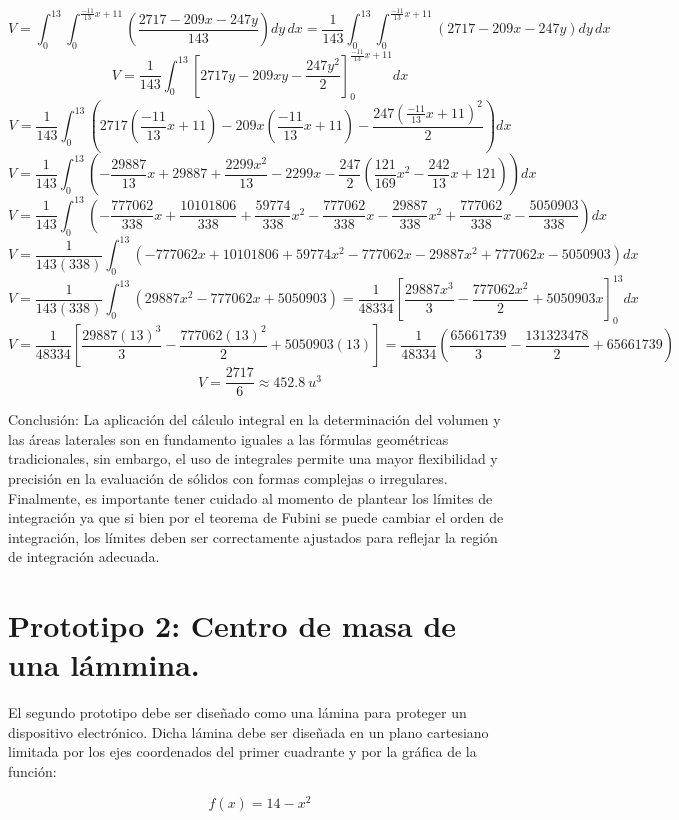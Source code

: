 \[V=\int_0^{13} \int_0^{\frac{-11}{13}x+11} \left(\frac{2717-209x-247y}{143}\right) dy\,dx = \frac{1}{143} \int_0^{13} \int_0^{\frac{-11}{13}x+11} \left(2717-209x-247y\right) dy\,dx\]
\[V=\frac{1}{143} \int_0^{13} \left[ 2717y - 209xy - \frac{247y^2}{2} \right]_0^{\frac{-11}{13}x+11} dx\]
\[V=\frac{1}{143} \int_0^{13} \left( 2717\left(\frac{-11}{13}x+11\right) - 209x\left(\frac{-11}{13}x+11\right) - \frac{247\left(\frac{-11}{13}x+11\right)^2}{2} \right) dx\]
\[V=\frac{1}{143} \int_0^{13} \left(-\frac{29887}{13}x+29887+\frac{2299x^2}{13}-2299x-\frac{247}{2}\left(\frac{121}{169}x^2-\frac{242}{13}x+121\right)\right) dx\]
\[V=\frac{1}{143}\int_{0}^{13}\left(-\frac{777062}{338}x+\frac{10101806}{338}+\frac{59774}{338}x^2-\frac{777062}{338}x-\frac{29887}{338}x^{2}+\frac{777062}{338}x-\frac{5050903}{338}\right) dx\]
\[V=\frac{1}{143(338)} \int_{0}^{13} \left(-777062x+10101806+59774x^2-777062x-29887x^{2}+777062x-5050903\right) dx\]
\[V=\frac{1}{143(338)} \int_{0}^{13} \left(29887x^{2}-777062x+5050903\right) =\frac{1}{48334} \left[ \frac{29887x^{3}}{3} - \frac{777062x^{2}}{2} + 5050903x \right]_0^{13}dx\]
\[V=\frac{1}{48334} \left[ \frac{29887(13)^{3}}{3} - \frac{777062(13)^{2}}{2} + 5050903(13) \right] = \frac{1}{48334}\left(\frac{65661739}{3}-\frac{131323478}{2}+65661739\right)\]
\[V = \frac{2717}{6} \approx 452.8\ u^3\]

Conclusión: La aplicación del cálculo integral en la determinación del volumen y las áreas laterales son en fundamento iguales a las fórmulas geométricas tradicionales, sin embargo, el uso de integrales permite una mayor flexibilidad y precisión en la evaluación de sólidos con formas complejas o irregulares. Finalmente, es importante tener cuidado al momento de plantear los límites de integración ya que si bien por el teorema de Fubini se puede cambiar el orden de integración, los límites deben ser correctamente ajustados para reflejar la región de integración adecuada.

\newpage

\section{Prototipo 2: Centro de masa de una lámmina.}

El segundo prototipo debe ser diseñado como una lámina para proteger un dispositivo electrónico. Dicha lámina debe ser diseñada en un plano cartesiano limitada por los ejes coordenados del primer cuadrante y por la gráfica de la función:

\[f(x) = 14-x^{2}\]

